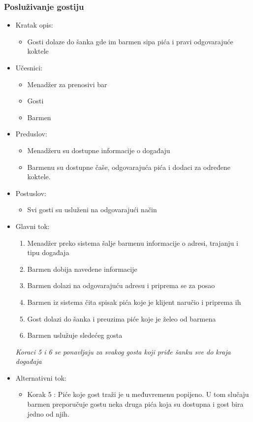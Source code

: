 \documentclass[a4paper]{article}
\begin{document}
\subsubsection{Posluživanje gostiju}

\begin{itemize}
    \item Kratak opis:
        \begin{itemize}
            \item Gosti dolaze do šanka gde im barmen sipa pića i pravi odgovarajuće koktele 
        \end{itemize}
    \item Učesnici:
        \begin{itemize}
            \item Menadžer za prenosivi bar
            \item Gosti
            \item Barmen
        \end{itemize}
    \item Preduslov:
        \begin{itemize}
            \item Menadžeru su dostupne informacije o događaju
            \item Barmenu su dostupne čaše, odgovarajuća 
		    pića i dodaci za određene koktele.
        \end{itemize}
    \item Postuslov:
        \begin{itemize}
            \item Svi gosti su usluženi na odgovarajući način
        \end{itemize}
    \item Glavni tok:
        \begin{enumerate}
            \item Menadžer preko sistema šalje barmenu informacije o adresi, trajanju i tipu događaja
            \item Barmen dobija navedene informacije
            \item Barmen dolazi na odgovarajuću adresu i priprema se za posao
            \item Barmen iz sistema čita spisak pića koje je klijent naručio i priprema ih
           \item Gost dolazi do šanka i preuzima piće koje je želeo od barmena
		   \item Barmen uslužuje sledećeg gosta
		  \end{enumerate}
		\textit{Koraci 5 i 6 se ponavljaju za svakog gosta koji priđe šanku sve do kraja događaja}
	
    \item Alternativni tok:
        \begin{itemize}
	      \item	Korak 5 : Piće koje gost traži je u međuvremenu popijeno. U tom slučaju barmen preporučuje gostu neka druga pića koja su dostupna i gost bira jedno od njih.

        \end{itemize}
\end{itemize}
\end{document}
